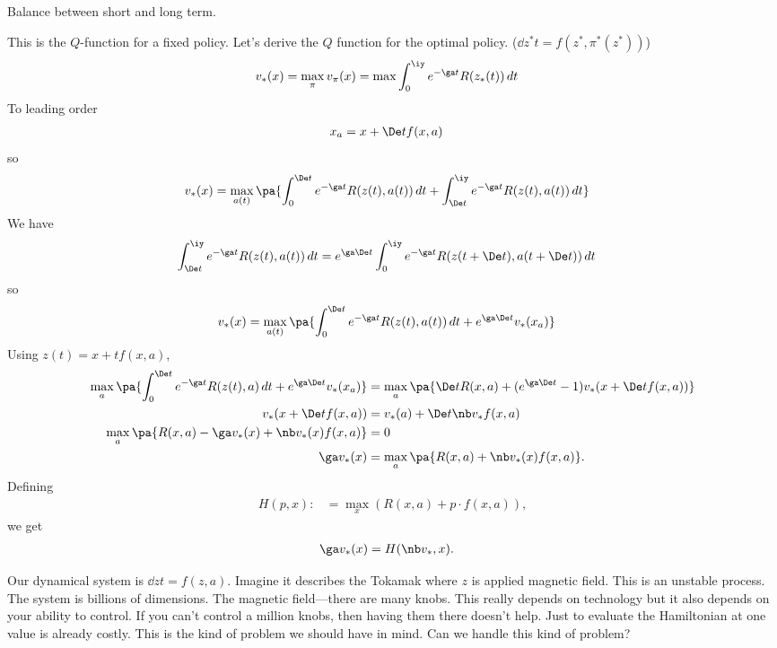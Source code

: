 Balance between short and long term.


This is the $Q$-function for a fixed policy. Let's derive the $Q$ function for  the optimal policy. ($\dd{z^*}t = f(z^*,\pi^*(z^*))$)
\begin{align}
v_*(x) &= \max_\pi v_\pi(x) = \max\int_0^\iy e^{-\ga t} R(z_*(t))\,dt
\end{align}
To leading order
\begin{align}
x_a&= x+\De t f(x,a)
\end{align}
so 
\begin{align}
v_*(x) &= \max_{a(t)} \pa{
\int_0^{\De t} e^{-\ga t} 
R(z(t),a(t)) \,dt + \int_{\De t}^\iy e^{-\ga t} R(z(t), a(t))\,dt
}
\end{align}
We have
\begin{align}
\int_{\De t}^\iy e^{-\ga t} R(z(t), a(t))\,dt
&=e^{\ga \De t} \int_0^\iy e^{-\ga t} R(z(t+\De t), a(t+\De t))\,dt
\end{align}
so
\begin{align}
v_*(x) &= \max_{a(t)} \pa{
\int_0^{\De t} e^{-\ga t} 
R(z(t),a(t)) \,dt +e^{\ga \De t} v_*(x_a)
}
\end{align}
Using $z(t) = x+tf(x,a)$, 
\begin{align}
\max_a\pa{ \int_0^{\De t} e^{-\ga t} R(z(t),a)\,dt + e^{\ga \De t}v_*(x_a)}
&=
\max_a \pa{\De t R(x,a) + (e^{\ga \De t}-1) v_*(x+\De t f(x,a))}\\
v_*(x+\De t f(x,a)) &=v_*(a)+\De t\nb v_* f(x,a)\\
\max_a \pa{
R(x,a) - \ga v_*(x) + \nb v_*(x) f(x,a)
}&=0\\
\ga v_*(x) &= \max_a\pa{R(x,a) + \nb v_*(x)f(x,a)}.
\end{align}
Defining 
\begin{align}
H(p,x) :&= \max_x (R(x,a) + p\cdot f(x,a)),
\end{align}
we get
\begin{align}
\ga v_*(x) &= H(\nb v_*,x).
\end{align}

Our dynamical system is $\dd zt = f(z,a)$. Imagine it describes the Tokamak where $z$ is applied magnetic field. This is an unstable process. The system is billions of dimensions. The magnetic field---there are many knobs. This really depends on technology but it also depends on your ability to control. If you can't control a million knobs, then having them there doesn't help.
Just to evaluate the Hamiltonian at one value is already costly.
This is the kind of problem we should have in mind. Can we handle this kind of problem?


